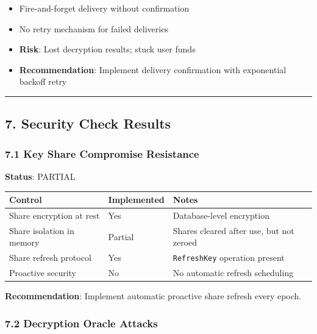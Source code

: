 \documentclass[
]{article}
\newcounter{none} %
\providecommand{\tightlist}{%
  \setlength{\itemsep}{0pt}\setlength{\parskip}{0pt}}
\begin{document}
\begin{itemize}
\tightlist
\item
  Fire-and-forget delivery without confirmation
\item
  No retry mechanism for failed deliveries
\item
  \textbf{Risk}: Lost decryption results; stuck user funds
\item
  \textbf{Recommendation}: Implement delivery confirmation with
  exponential backoff retry
\end{itemize}

\begin{center}\rule{0.5\linewidth}{0.5pt}\end{center}

\subsection{7. Security Check Results}\label{7-security-check-results}

\subsubsection{7.1 Key Share Compromise
Resistance}\label{71-key-share-compromise-resistance}

\textbf{Status}: PARTIAL

{\def\LTcaptype{none} %
\begin{longtable}[]{@{}lll@{}}
\toprule\noalign{}
Control & Implemented & Notes \\
\midrule\noalign{}
\endhead
\bottomrule\noalign{}
\endlastfoot
Share encryption at rest & Yes & Database-level encryption \\
Share isolation in memory & Partial & Shares cleared after use, but not
zeroed \\
Share refresh protocol & Yes & \texttt{RefreshKey} operation present \\
Proactive security & No & No automatic refresh scheduling \\
\end{longtable}
}

\textbf{Recommendation}: Implement automatic proactive share refresh
every epoch.

\subsubsection{7.2 Decryption Oracle
Attacks}\label{72-decryption-oracle-attacks}
\end{document}
